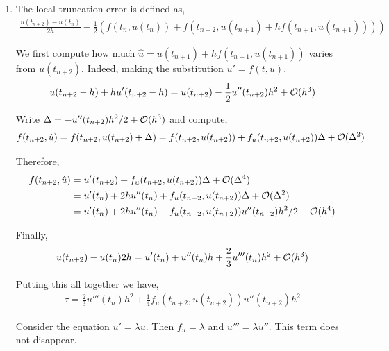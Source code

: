 \documentclass[10pt]{article}
\begin{document}
\begin{solution}[Solution]
\begin{enumerate}[label=(\alph*)]
    \item 
        The local truncation error is defined as,
        \begin{align*}
            \frac{u(t_{n+2}) - u(t_n)}{2h} - \frac{1}{2} (f(t_n,u(t_n)) + f(t_{n+2},u(t_{n+1}) + hf(t_{n+1},u(t_{n+1}))))
        \end{align*}
        
        We first compute how much \( \hat{u} = u(t_{n+1}) + h f(t_{n+1},u(t_{n+1})) \) varies from \( u(t_{n+2}) \). Indeed, making the substitution \( u' = f(t,u) \),
        \begin{align*}
            u(t_{n+2}-h) + h u'(t_{n+2}-h)
            = u(t_{n+2}) - \frac{1}{2}u''(t_{n+2})h^2 + \mathcal{O}(h^3) 
        \end{align*}
        
        Write \( \Delta = -u''(t_{n+2})h^2/2 + \mathcal{O}(h^3) \) and compute,
        \begin{align*}
            f(t_{n+2}, \hat{u}) 
            = f(t_{n+2}, u(t_{n+2}) + \Delta) 
            = f(t_{n+2},u(t_{n+2})) + f_u(t_{n+2},u(t_{n+2}))\Delta  + \mathcal{O}(\Delta^2)
        \end{align*}

        Therefore,
        \begin{align*}
            f(t_{n+2},\hat{u}) &= u'(t_{n+2}) + f_u(t_{n+2},u(t_{n+2}))\Delta + \mathcal{O}(\Delta^4)
            \\&= u'(t_n) + 2h u''(t_n) + f_u(t_{n+2},u(t_{n+2})) \Delta + \mathcal{O}(\Delta^2)
            \\&= u'(t_n) + 2h u''(t_n) - f_u(t_{n+2},u(t_{n+2})) u''(t_{n+2})h^2/2  + \mathcal{O}(h^4)
        \end{align*}
        
        Finally,
        \begin{align*}
            {u(t_{n+2}) - u(t_n)}{2h}
            = u'(t_n) + u''(t_n) h + \frac{2}{3}u'''(t_n)h^2 + \mathcal{O}(h^3)
        \end{align*}
        
        Putting this all together we have,
        \begin{align*}
            \tau = \frac{2}{3} u'''(t_n)h^2 + \frac{1}{4} f_u(t_{n+2},u(t_{n+2})) u''(t_{n+2}) h^2
        \end{align*}
       
        Consider the equation \( u' = \lambda u \). Then \( f_u = \lambda \) and \( u''' = \lambda u'' \). This term does not disappear.
        

\end{enumerate}
\end{solution}
\end{document}
